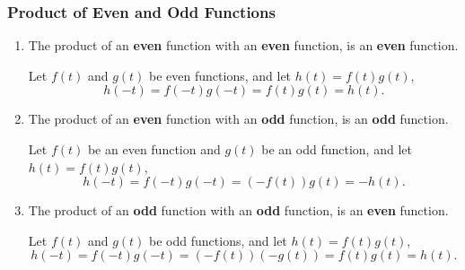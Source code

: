 \documentclass{article}
\begin{document}
\subsubsection{Product of Even and Odd Functions}
\begin{enumerate}
    \item The product of an \textbf{even} function with an \textbf{even} function, is an \textbf{even} function.

          Let \(f\left( t \right)\) and \(g\left( t \right)\) be even functions, and let \(h\left( t \right) = f\left( t \right) g\left( t \right)\),
          \begin{equation*}
              h\left( -t \right) = f\left( -t \right) g\left( -t \right) = f\left( t \right) g\left( t \right) = h\left( t \right).
          \end{equation*}
    \item The product of an \textbf{even} function with an \textbf{odd} function, is an \textbf{odd} function.

          Let \(f\left( t \right)\) be an even function and \(g\left( t \right)\) be an odd function, and let \(h\left( t \right) = f\left( t \right) g\left( t \right)\),
          \begin{equation*}
              h\left( -t \right) = f\left( -t \right) g\left( -t \right) = \left( -f\left( t \right) \right) g\left( t \right) = -h\left( t \right).
          \end{equation*}
    \item The product of an \textbf{odd} function with an \textbf{odd} function, is an \textbf{even} function.

          Let \(f\left( t \right)\) and \(g\left( t \right)\) be odd functions, and let \(h\left( t \right) = f\left( t \right) g\left( t \right)\),
          \begin{equation*}
              h\left( -t \right) = f\left( -t \right) g\left( -t \right) = \left( -f\left( t \right) \right) \left( -g\left( t \right) \right) = f\left( t \right) g\left( t \right) = h\left( t \right).
          \end{equation*}
\end{enumerate}
\end{document}

